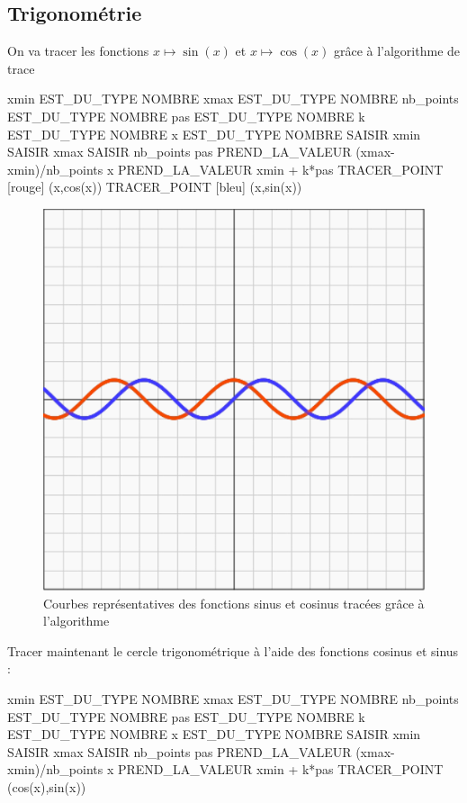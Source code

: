 \subsection{Trigonométrie}
On va tracer les fonctions $x\mapsto \sin(x)$ et $x\mapsto \cos(x)$ grâce à l'algorithme de trace
\begin{algobox}
\Variables
\Ligne xmin EST\_DU\_TYPE NOMBRE
\Ligne xmax EST\_DU\_TYPE NOMBRE
\Ligne nb\_points EST\_DU\_TYPE NOMBRE
\Ligne pas EST\_DU\_TYPE NOMBRE
\Ligne k EST\_DU\_TYPE NOMBRE
\Ligne x EST\_DU\_TYPE NOMBRE
\DebutAlgo
\Ligne SAISIR xmin
\Ligne SAISIR xmax
\Ligne SAISIR nb\_points
\Ligne pas PREND\_LA\_VALEUR (xmax-xmin)/nb\_points
\DebutPour
\Ligne x PREND\_LA\_VALEUR xmin + k*pas
\Ligne TRACER\_POINT [rouge] (x,cos(x))
\Ligne TRACER\_POINT [bleu] (x,sin(x))
\FinPour
\FinAlgo
\end{algobox}
\begin{figure}[H]
\centering
\includegraphics[scale=0.5]{images/cos_sin.png}
\caption{Courbes représentatives des fonctions sinus et cosinus tracées grâce à l'algorithme}
\end{figure}
Tracer maintenant le cercle trigonométrique à l'aide des fonctions cosinus et sinus : 
\begin{algobox}
\Variables
\Ligne xmin EST\_DU\_TYPE NOMBRE
\Ligne xmax EST\_DU\_TYPE NOMBRE
\Ligne nb\_points EST\_DU\_TYPE NOMBRE
\Ligne pas EST\_DU\_TYPE NOMBRE
\Ligne k EST\_DU\_TYPE NOMBRE
\Ligne x EST\_DU\_TYPE NOMBRE
\DebutAlgo
\Ligne SAISIR xmin
\Ligne SAISIR xmax
\Ligne SAISIR nb\_points
\Ligne pas PREND\_LA\_VALEUR (xmax-xmin)/nb\_points
\DebutPour
\Ligne x PREND\_LA\_VALEUR xmin + k*pas
\Ligne TRACER\_POINT (cos(x),sin(x))
\FinPour
\FinAlgo

\end{algobox}
